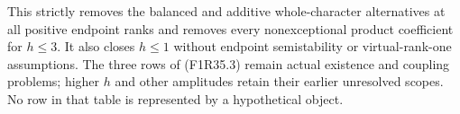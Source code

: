 This strictly removes the balanced and additive
whole-character alternatives at all positive endpoint
ranks and removes every nonexceptional product coefficient
for $h\le3$. It also closes $h\le1$ without endpoint
semistability or virtual-rank-one assumptions. The
three rows of (F1R35.3) remain actual existence and
coupling problems; higher $h$ and other amplitudes
retain their earlier unresolved scopes. No row in
that table is represented by a hypothetical object.
